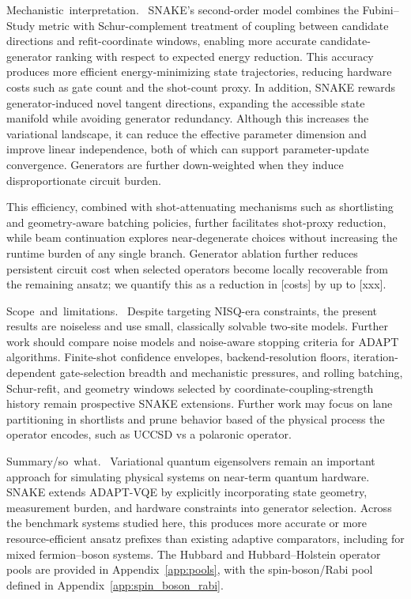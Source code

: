 \documentclass[
  reprint,
  amsmath,
  amssymb,
  aps,
  pra,
  nofootinbib,
  superscriptaddress,
  floatfix
]{revtex4-2}
\newcommand{\placeholder}[1]{\textcolor{red!70!black}{\ifmmode\left[#1\right]\else\textsf{[#1]}\fi}}
\newcommand{\tentative}[1]{\textcolor{red!70!black}{#1}}
\newcommand{\structlabel}[1]{\noindent\mbox{\tentative{#1.}}~}
\begin{document}
\structlabel{Mechanistic interpretation}
SNAKE's second-order model combines the Fubini--Study metric with Schur-complement treatment of coupling between candidate directions and refit-coordinate windows, enabling more accurate candidate-generator ranking with respect to expected energy reduction. This accuracy produces more efficient energy-minimizing state trajectories, reducing hardware costs such as gate count and the shot-count proxy. In addition, SNAKE rewards generator-induced novel tangent directions, expanding the accessible state manifold while avoiding generator redundancy. Although this increases the variational landscape, it can reduce the effective parameter dimension and improve linear independence, both of which can support parameter-update convergence. Generators are further down-weighted when they induce disproportionate circuit burden.

This efficiency, combined with shot-attenuating mechanisms such as shortlisting and geometry-aware batching policies, further facilitates shot-proxy reduction, while beam continuation explores near-degenerate choices without increasing the runtime burden of any single branch. Generator ablation further reduces persistent circuit cost when selected operators become locally recoverable from the remaining ansatz; we quantify this as a reduction in \placeholder{costs} by up to \placeholder{xxx}.

\structlabel{Scope and limitations}
Despite targeting NISQ-era constraints, the present results are noiseless and use small, classically solvable two-site models. Further work should compare noise models and noise-aware stopping criteria for ADAPT algorithms. Finite-shot confidence envelopes, backend-resolution floors, iteration-dependent gate-selection breadth and mechanistic pressures, and rolling batching, Schur-refit, and geometry windows selected by coordinate-coupling-strength history remain prospective SNAKE extensions. Further work may focus on lane partitioning in shortlists and prune behavior based of the physical process the operator encodes, such as UCCSD vs a polaronic operator.

\structlabel{Summary/so what}
Variational quantum eigensolvers remain an important approach for simulating physical systems on near-term quantum hardware. SNAKE extends ADAPT-VQE by explicitly incorporating state geometry, measurement burden, and hardware constraints into generator selection. Across the benchmark systems studied here, this produces more accurate or more resource-efficient ansatz prefixes than existing adaptive comparators, including for mixed fermion--boson systems. The Hubbard and Hubbard--Holstein operator pools are provided in Appendix~\ref{app:pools}, with the spin-boson/Rabi pool defined in Appendix~\ref{app:spin_boson_rabi}.
\end{document}
